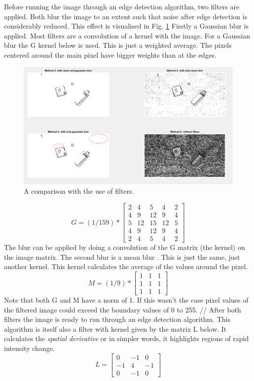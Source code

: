 \documentclass[11pt]{article}
\begin{document}
Before running the image through an edge detection algorithm, two filters are applied. Both blur the image to an extent such that noise after edge detection is considerably reduced. This effect is visualised in Fig. \ref{fig:filter_comparison}
Firstly a Gaussian blur is applied. Most filters are a convolution of a kernel with the image. For a Gaussian blur the G kernel below is used. This is just a weighted average. The pixels centered around the main pixel have bigger weights than at the edges.
\begin{figure}[h]
	\center
  \includegraphics[width=0.7\linewidth]{filter_comparison.png}
  \caption{A comparison with the use of filters.}
  \label{fig:filter_comparison}
\end{figure}

\begin{equation}
  G = (1/159) * 
  \begin{bmatrix}
   2 & 4 & 5 & 4 & 2\\
   4 & 9 & 12 & 9 & 4\\
   5 & 12 & 15 & 12 & 5\\
   4 & 9 & 12 & 9& 4\\
   2 & 4 & 5 & 4 & 2
  \end{bmatrix}
\end{equation}
The blur can be applied by doing a convolution of the G matrix (the kernel) on the image matrix.
The second blur is a mean blur \cite{mean}. This is just the same, just another kernel. This kernel calculates the average of the values around the pixel.
\begin{equation}
M = (1/9) * 
\begin{bmatrix}
	1&1&1\\
	1&1&1\\
	1&1&1
\end{bmatrix}
\end{equation}
Note that both G and M have a norm of 1. If this wasn't the case pixel values of the filtered image could exceed the boundary values of 0 to 255. //
After both filters the image is ready to run through an edge detection algorithm\cite{edge_detection}. This algorithm is itself also a filter with kernel given by the matrix L below.
It calculates the \textit{spatial  derivative} or in simpler words, it highlights regions of rapid intensity change.
\begin{equation}
L =\begin{bmatrix}
	0&-1&0\\
	-1&4&-1\\
	0&-1&0
\end{bmatrix}
\end{equation}
\end{document}
